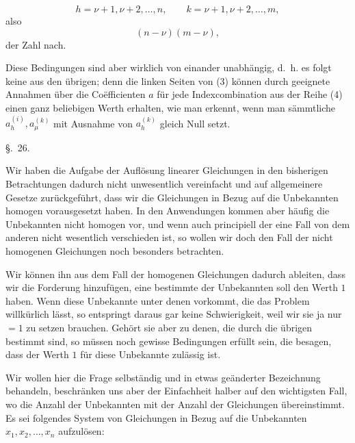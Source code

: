 
\begin{equation}
 h=\nu+1,\nu+2,\ldots,n,
 \qquad
 k=\nu+1,\nu+2,\ldots,m,
\tag{4}
\end{equation}
also
\begin{equation}
 (n-\nu)(m-\nu),
\tag{5}
\end{equation}
der Zahl nach.

Diese Bedingungen sind aber wirklich von einander unabhängig, d.~h. es folgt keine aus den übrigen; denn die linken Seiten von (3) können durch geeignete Annahmen über die Coëfficienten $a$ für jede Indexcombination aus der Reihe (4) einen ganz beliebigen Werth erhalten, wie man erkennt, wenn man sämmtliche $a_h^{(i)},a_\mu^{(k)}$ mit Ausnahme von $a_h^{(k)}$ gleich Null setzt.



\begin{center}
{\large \S.\ 26.}

\vspace{0.5em}
{\large{}}
\end{center}

Wir haben die Aufgabe der Auflösung linearer Gleichungen in den bisherigen Betrachtungen dadurch nicht unwesentlich vereinfacht und auf allgemeinere Gesetze zurückgeführt, dass wir die Gleichungen in Bezug auf die Unbekannten homogen vorausgesetzt haben. In den Anwendungen kommen aber häufig die Unbekannten nicht homogen vor, und wenn auch principiell der eine Fall von dem anderen nicht wesentlich verschieden ist, so wollen wir doch den Fall der nicht homogenen Gleichungen noch besonders betrachten.

Wir können ihn aus dem Fall der homogenen Gleichungen dadurch ableiten, dass wir die Forderung hinzufügen, eine bestimmte der Unbekannten soll den Werth $1$ haben. Wenn diese Unbekannte unter denen vorkommt, die das Problem willkürlich lässt, so entspringt daraus gar keine Schwierigkeit, weil wir sie ja nur $=1$ zu setzen brauchen. Gehört sie aber zu denen, die durch die übrigen bestimmt sind, so müssen noch gewisse Bedingungen erfüllt sein, die besagen, dass der Werth $1$ für diese Unbekannte zulässig ist.

Wir wollen hier die Frage selbständig und in etwas geänderter Bezeichnung behandeln, beschränken uns aber der Einfachheit halber auf den wichtigsten Fall, wo die Anzahl der Unbekannten mit der Anzahl der Gleichungen übereinstimmt. Es sei folgendes System von Gleichungen in Bezug auf die Unbekannten $x_1,x_2,\ldots,x_n$ aufzulösen:
